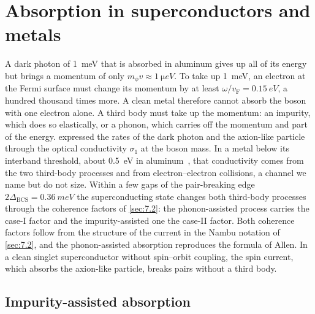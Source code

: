 \section{Absorption in superconductors and metals}\label{sec:15.4}

A dark photon of \SI{1}{meV} that is absorbed in aluminum gives up all of its energy but brings a momentum of only $m_\phi v \approx \SI{1}{\micro eV}$. To take up \SI{1}{meV}, an electron at the Fermi surface must change its momentum by at least $\omega/v_{\mathrm{F}} = \SI{0.15}{eV}$, a hundred thousand times more. A clean metal therefore cannot absorb the boson with one electron alone. A third body must take up the momentum: an impurity, which does so elastically, or a phonon, which carries off the momentum and part of the energy.  expressed the rates of the dark photon and the axion-like particle through the optical conductivity $\sigma_1$ at the boson mass. In a metal below its interband threshold, about \SI{0.5}{eV} in aluminum~\cite[p.~4]{hochberg2016absorption}, that conductivity comes from the two third-body processes and from electron--electron collisions, a channel we name but do not size. Within a few gaps of the pair-breaking edge $2\Delta_{\mathrm{BCS}} = \SI{0.36}{meV}$ the superconducting state changes both third-body processes through the coherence factors of \cref{sec:7.2}: the phonon-assisted process carries the case-I factor and the impurity-assisted one the case-II factor. Both coherence factors follow from the structure of the current in the Nambu notation of \cref{sec:7.2}, and the phonon-assisted absorption reproduces the formula of Allen. In a clean singlet superconductor without spin--orbit coupling, the spin current, which absorbs the axion-like particle, breaks pairs without a third body.

\subsection{Impurity-assisted absorption}\label{sec:15.4-MB}

